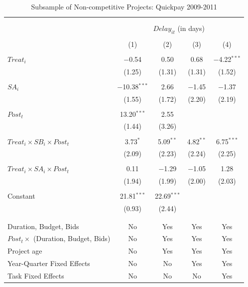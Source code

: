 \documentclass[
]{article}
\begin{document}
\begin{table}[H] \centering 
  \caption{Subsample of Non-competitive Projects: Quickpay 2009-2011} 
  \label{} 
\small 
\begin{tabular}{@{\extracolsep{-2pt}}lcccc} 
\\[-1.8ex]\hline 
\hline \\[-1.8ex] 
\\[-1.8ex] & \multicolumn{4}{c}{$Delay_{it}$ (in days)} \\ 
\\[-1.8ex] & (1) & (2) & (3) & (4)\\ 
\hline \\[-1.8ex] 
 $Treat_i$ & $-$0.54 & 0.50 & 0.68 & $-$4.22$^{***}$ \\ 
  & (1.25) & (1.31) & (1.31) & (1.52) \\ 
  & & & & \\ 
 $SA_i$ & $-$10.38$^{***}$ & 2.66 & $-$1.45 & $-$1.37 \\ 
  & (1.55) & (1.72) & (2.20) & (2.19) \\ 
  & & & & \\ 
 $Post_t$ & 13.20$^{***}$ & 2.55 &  &  \\ 
  & (1.44) & (3.26) &  &  \\ 
  & & & & \\ 
 $Treat_i \times SB_i \times Post_t$ & 3.73$^{*}$ & 5.09$^{**}$ & 4.82$^{**}$ & 6.75$^{***}$ \\ 
  & (2.09) & (2.23) & (2.24) & (2.25) \\ 
  & & & & \\ 
 $Treat_i \times SA_i \times Post_t$ & 0.11 & $-$1.29 & $-$1.05 & 1.28 \\ 
  & (1.94) & (1.99) & (2.00) & (2.03) \\ 
  & & & & \\ 
 Constant & 21.81$^{***}$ & 22.69$^{***}$ &  &  \\ 
  & (0.93) & (2.44) &  &  \\ 
  & & & & \\ 
\hline \\[-1.8ex] 
Duration, Budget, Bids & No & Yes & Yes & Yes \\ 
$Post_t \times $  (Duration, Budget, Bids) & No & Yes & Yes & Yes \\ 
Project age & No & Yes & Yes & Yes \\ 
Year-Quarter Fixed Effects & No & No & Yes & Yes \\ 
Task Fixed Effects & No & No & No & Yes \\ 

\end{tabular}
\end{table}
\end{document}
